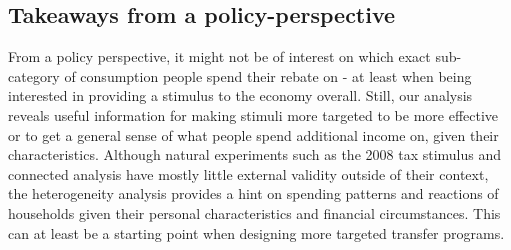 \subsection{Takeaways from a policy-perspective}
From a policy perspective, it might not be of interest on which exact sub-category of consumption people spend their rebate on - at least when being interested in providing a stimulus to the economy overall. Still, our analysis reveals useful information for making stimuli more targeted to be more effective or to get a general sense of what people spend additional income on, given their characteristics. Although natural experiments such as the 2008 tax stimulus and connected analysis have mostly little external validity outside of their context, the heterogeneity analysis provides a hint on spending patterns and reactions of households given their personal characteristics and financial circumstances. This can at least be a starting point when designing more targeted transfer programs.